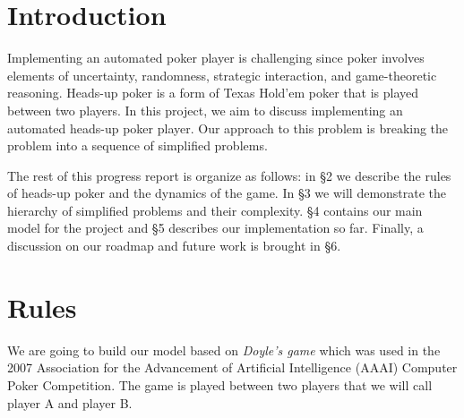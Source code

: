\section{Introduction}\label{intro}
Implementing an automated poker player is challenging since poker involves
elements of uncertainty, randomness, strategic interaction, and game-theoretic
reasoning. Heads-up poker is a form of Texas Hold'em poker that is played 
between two players. In this project, we aim to discuss implementing an 
automated heads-up poker player. Our approach to this problem is breaking
the problem into a sequence of simplified problems. 

The rest of this progress report is organize as follows: in \S 2 we describe the
rules of heads-up poker and the dynamics of the game. In \S 3 we will
demonstrate the hierarchy of simplified problems and their complexity.
\S 4 contains our main model for the project and \S 5 describes our implementation
so far. Finally, a discussion on our roadmap and future work is brought in \S6.

\section{Rules}
We are going to build our model based on \emph{Doyle's game} which was used 
in the 2007 Association for the Advancement of Artificial Intelligence (AAAI) 
Computer Poker Competition. The game is played between two players that we 
will call player A and player B. 

